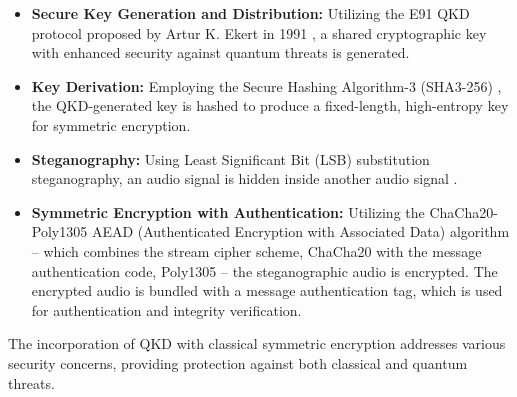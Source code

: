 \documentclass[a4paper]{cas-sc}
\begin{document}
\begin{itemize}
    \item \textbf{Secure Key Generation and Distribution:} Utilizing the E91 QKD protocol proposed by Artur K. Ekert in 1991 \cite{Ekert1991}, a shared cryptographic key with enhanced security against quantum threats is generated.
    \item \textbf{Key Derivation:} Employing the Secure Hashing Algorithm-3 (SHA3-256) \cite{dworkin2015sha}, the QKD-generated key is hashed to produce a fixed-length, high-entropy key for symmetric encryption.
    \item \textbf{Steganography:} Using Least Significant Bit (LSB) substitution steganography, an audio signal is hidden inside another audio signal \cite{cvejic2002increasing}.
    \item \textbf{Symmetric Encryption with Authentication:} Utilizing the ChaCha20-Poly1305 AEAD (Authenticated Encryption with Associated Data) algorithm \cite{rfc7539} -- which combines the stream cipher scheme, ChaCha20 \cite{bernstein2008chacha} with the message authentication code, Poly1305 \cite{bernstein2005poly1305} -- the steganographic audio is encrypted. The encrypted audio is bundled with a message authentication tag, which is used for authentication and integrity verification.
\end{itemize}
The incorporation of QKD with classical symmetric encryption addresses various security concerns, providing protection against both classical and quantum threats.
\end{document}
